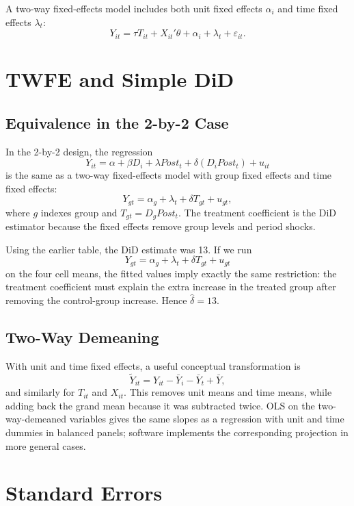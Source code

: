 \begin{defN}
A two-way fixed-effects model includes both unit fixed effects $\alpha_i$ and
time fixed effects $\lambda_t$:
\[
    Y_{it}=\tau T_{it}+X_{it}'\theta+\alpha_i+\lambda_t+\varepsilon_{it}.
\]
\end{defN}

\section{TWFE and Simple DiD}

\subsection{Equivalence in the 2-by-2 Case}

In the 2-by-2 design, the regression
\[
    Y_{it}=\alpha+\beta D_i+\lambda Post_t+\delta(D_iPost_t)+u_{it}
\]
is the same as a two-way fixed-effects model with group fixed effects and time
fixed effects:
\[
    Y_{gt}=\alpha_g+\lambda_t+\delta T_{gt}+u_{gt},
\]
where $g$ indexes group and $T_{gt}=D_gPost_t$. The treatment coefficient is the
DiD estimator because the fixed effects remove group levels and period shocks.

\begin{exmp}
Using the earlier table, the DiD estimate was 13. If we run
\[
    Y_{gt}=\alpha_g+\lambda_t+\delta T_{gt}+u_{gt}
\]
on the four cell means, the fitted values imply exactly the same restriction:
the treatment coefficient must explain the extra increase in the treated group
after removing the control-group increase. Hence $\hat{\delta}=13$.
\end{exmp}

\subsection{Two-Way Demeaning}

With unit and time fixed effects, a useful conceptual transformation is
\[
    \tilde{Y}_{it}
    =
    Y_{it}-\bar{Y}_i-\bar{Y}_t+\bar{Y},
\]
and similarly for $T_{it}$ and $X_{it}$. This removes unit means and time means,
while adding back the grand mean because it was subtracted twice. OLS on the
two-way-demeaned variables gives the same slopes as a regression with unit and
time dummies in balanced panels; software implements the corresponding
projection in more general cases.

\section{Standard Errors}


